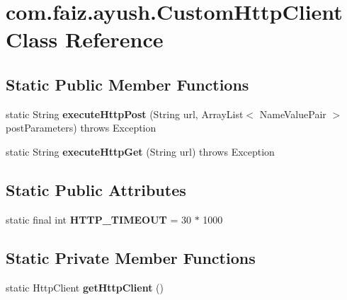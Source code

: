 \hypertarget{classcom_1_1faiz_1_1ayush_1_1_custom_http_client}{}\section{com.\+faiz.\+ayush.\+Custom\+Http\+Client Class Reference}
\label{classcom_1_1faiz_1_1ayush_1_1_custom_http_client}
\subsection*{Static Public Member Functions}
\begin{DoxyCompactItemize}
\item 
\hypertarget{classcom_1_1faiz_1_1ayush_1_1_custom_http_client_acc41960fe655cd519927b37aea5b70fe}{}static String {\bfseries execute\+Http\+Post} (String url, Array\+List$<$ Name\+Value\+Pair $>$ post\+Parameters)  throws Exception \label{classcom_1_1faiz_1_1ayush_1_1_custom_http_client_acc41960fe655cd519927b37aea5b70fe}

\item 
\hypertarget{classcom_1_1faiz_1_1ayush_1_1_custom_http_client_ae642c882f679d5ed123da03f929d68ea}{}static String {\bfseries execute\+Http\+Get} (String url)  throws Exception \label{classcom_1_1faiz_1_1ayush_1_1_custom_http_client_ae642c882f679d5ed123da03f929d68ea}

\end{DoxyCompactItemize}
\subsection*{Static Public Attributes}
\begin{DoxyCompactItemize}
\item 
\hypertarget{classcom_1_1faiz_1_1ayush_1_1_custom_http_client_a9096d39d33f596fdc95d49b7587bd47a}{}static final int {\bfseries H\+T\+T\+P\+\_\+\+T\+I\+M\+E\+O\+U\+T} = 30 $\ast$ 1000\label{classcom_1_1faiz_1_1ayush_1_1_custom_http_client_a9096d39d33f596fdc95d49b7587bd47a}

\end{DoxyCompactItemize}
\subsection*{Static Private Member Functions}
\begin{DoxyCompactItemize}
\item 
\hypertarget{classcom_1_1faiz_1_1ayush_1_1_custom_http_client_afb31ffac4ed4f05766d8c4087f56dac8}{}static Http\+Client {\bfseries get\+Http\+Client} ()\label{classcom_1_1faiz_1_1ayush_1_1_custom_http_client_afb31ffac4ed4f05766d8c4087f56dac8}

\end{DoxyCompactItemize}
